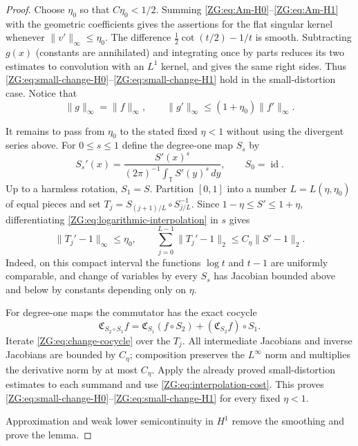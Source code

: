 \documentclass[11pt]{amsart}
\numberwithin{equation}{section}
\theoremstyle{definition}
\theoremstyle{remark}
\newcommand{\T}{\mathbb T}
\begin{document}
\begin{proof}
Choose $\eta_0$ so that $C\eta_0<1/2$.  Summing
\eqref{ZG:eq:Am-H0}--\eqref{ZG:eq:Am-H1} with the geometric coefficients gives
the assertions for the flat singular kernel whenever
$\|v'\|_\infty\le\eta_0$.  The
difference $\frac12\cot(t/2)-1/t$ is smooth.  Subtracting $g(x)$ (constants
are annihilated) and integrating once by parts reduces its two estimates
to convolution with an $L^1$ kernel, and gives the same right sides.
Thus \eqref{ZG:eq:small-change-H0}--\eqref{ZG:eq:small-change-H1} hold in the
small-distortion case.  Notice that
\[
 \|g\|_\infty=\|f\|_\infty,
 \qquad \|g'\|_\infty\le(1+\eta_0)\|f'\|_\infty.
\]

It remains to pass from $\eta_0$ to the stated fixed $\eta<1$ without
using the divergent series above.  For $0\le s\le1$ define the degree-one
map $S_s$ by
\begin{equation}\label{ZG:eq:logarithmic-interpolation}
 S_s'(x)=\frac{S'(x)^s}{(2\pi)^{-1}\int_\T S'(y)^s\,dy},
 \qquad S_0=\operatorname {id}.
\end{equation}
Up to a harmless rotation, $S_1=S$.  Partition $[0,1]$ into a number
$L=L(\eta,\eta_0)$ of equal pieces and set
$T_j=S_{(j+1)/L}\circ S_{j/L}^{-1}$.  Since
$1-\eta\le S'\le1+\eta$, differentiating
\eqref{ZG:eq:logarithmic-interpolation} in $s$ gives
\begin{equation}\label{ZG:eq:interpolation-cost}
 \|T_j'-1\|_\infty\le\eta_0,
 \qquad
 \sum_{j=0}^{L-1}\|T_j'-1\|_2
 \le C_\eta\|S'-1\|_2.
\end{equation}
Indeed, on this compact interval the functions $\log t$ and $t-1$ are
uniformly comparable, and change of variables by every $S_s$ has
Jacobian bounded above and below by constants depending only on $\eta$.

For degree-one maps the commutator has the exact cocycle
\begin{equation}\label{ZG:eq:change-cocycle}
 \mathfrak C_{S_2\circ S_1}f
 =\mathfrak C_{S_1}(f\circ S_2)
   +(\mathfrak C_{S_2}f)\circ S_1.
\end{equation}
Iterate \eqref{ZG:eq:change-cocycle} over the $T_j$.  All intermediate
Jacobians and inverse Jacobians are bounded by $C_\eta$; composition
preserves the $L^\infty$ norm and multiplies the derivative norm by at
most $C_\eta$.  Apply the already proved small-distortion estimates to
each summand and use \eqref{ZG:eq:interpolation-cost}.  This proves
\eqref{ZG:eq:small-change-H0}--\eqref{ZG:eq:small-change-H1} for every fixed
$\eta<1$.

Approximation and weak lower semicontinuity in $H^1$ remove the smoothing
and prove the lemma.
\end{proof}
\end{document}

